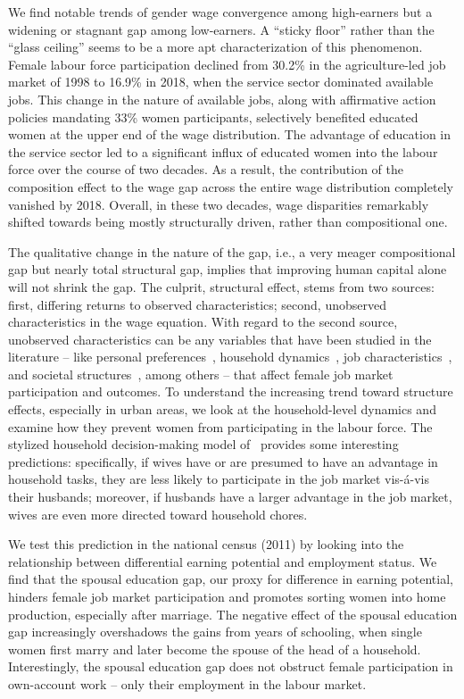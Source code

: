 We find notable trends of gender wage convergence among high-earners but a widening or stagnant gap among low-earners. A ``sticky floor'' rather than the ``glass ceiling'' seems to be a more apt characterization of this phenomenon. Female labour force participation declined from 30.2\% in the agriculture-led job market of 1998 to 16.9\% in 2018, when the service sector dominated available jobs. This change in the nature of available jobs, along with affirmative action policies mandating 33\% women participants, selectively benefited educated women at the upper end of the wage distribution. The advantage of education in the service sector led to a significant influx of educated women into the labour force over the course of two decades. As a result, the contribution of the composition effect to the wage gap across the entire wage distribution completely vanished by 2018. Overall, in these two decades, wage disparities remarkably shifted towards being mostly structurally driven, rather than compositional one.\par

The qualitative change in the nature of the gap, i.e., a very meager compositional gap but nearly total structural gap, implies that improving human capital alone will not shrink the gap. The culprit, structural effect, stems from two sources: first, differing returns to observed characteristics; second, unobserved characteristics in the wage equation. With regard to the second source, unobserved characteristics can be any variables that have been studied in the literature -- like personal preferences~\citep{Wiswall2017, LeBarbanchon2020}, household dynamics~\citep{Bertrand2015, Goldin2017}, job characteristics~\citep{Manning2008, Card2015}, and societal structures~\citep{Givord2015, Lippmann2020, Goldin2006, Becker2019}, among others -- that affect female job market participation and outcomes. To understand the increasing trend toward structure effects, especially in urban areas, we look at the household-level dynamics and examine how they prevent women from participating in the labour force. The stylized household decision-making model of~\citet{Cortes2020} provides some interesting predictions: specifically, if wives have or are presumed to have an advantage in household tasks, they are less likely to participate in the job market vis-\'{a}-vis their husbands; moreover, if husbands have a larger advantage in the job market, wives are even more directed toward household chores.\par

We test this prediction in the national census (2011) by looking into the relationship between differential earning potential and employment status. We find that the spousal education gap, our proxy for difference in earning potential, hinders female job market participation and promotes sorting women into home production, especially after marriage. The negative effect of the spousal education gap increasingly overshadows the gains from years of schooling, when single women first marry and later become the spouse of the head of a household. Interestingly, the spousal education gap does not obstruct female participation in own-account work -- only their employment in the labour market.\par

